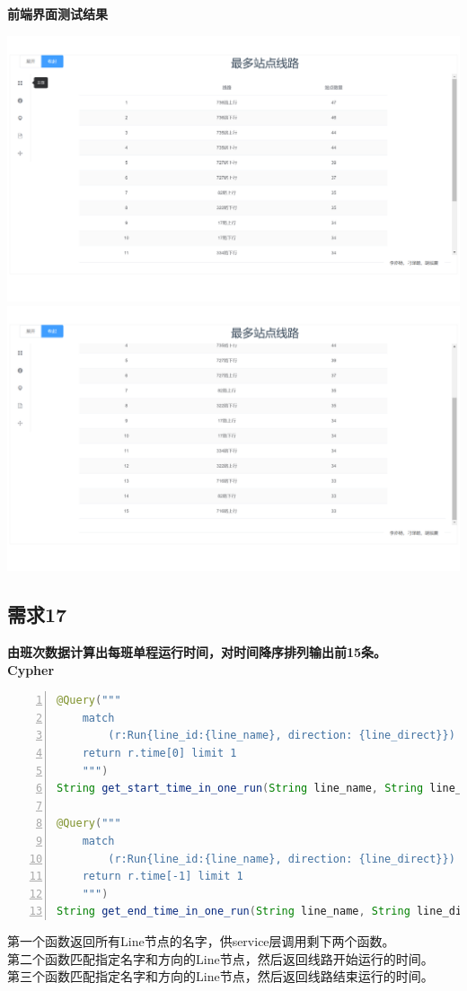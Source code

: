 \documentclass[11pt,a4paper]{article}
\begin{document}
\textbf{前端界面测试结果} \\
\begin{center}
\centering
\includegraphics[scale=0.3]{./assets/demand16_1.png} \\ 
\includegraphics[scale=0.3]{./assets/demand16_2.png} 
\end{center}

\subsection{需求17}
\textbf{由班次数据计算出每班单程运行时间，对时间降序排列输出前15条。} \\
\textbf{Cypher} \\
\begin{lstlisting}[numbers = left, 
showstringspaces=false,
showspaces = false,
breaklines = true, 
language=Java]
@Query("""
	match
		(r:Run{line_id:{line_name}, direction: {line_direct}})
	return r.time[0] limit 1
	""")
String get_start_time_in_one_run(String line_name, String line_direct);

@Query("""
	match
		(r:Run{line_id:{line_name}, direction: {line_direct}})
	return r.time[-1] limit 1
	""")
String get_end_time_in_one_run(String line_name, String line_direct);
\end{lstlisting} 
第一个函数返回所有Line节点的名字，供service层调用剩下两个函数。 \\
第二个函数匹配指定名字和方向的Line节点，然后返回线路开始运行的时间。\\
第三个函数匹配指定名字和方向的Line节点，然后返回线路结束运行的时间。
\end{document}
